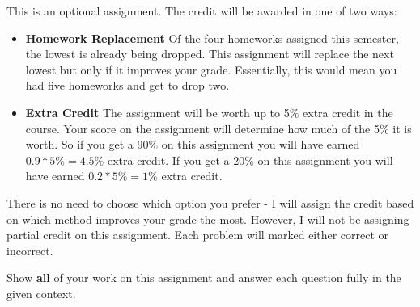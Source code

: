 \documentclass[11pt]{article}\usepackage[]{graphicx}\usepackage[]{color}
\begin{document}
\pagestyle{fancy} 

This is an optional assignment. The credit will be awarded in one of two ways:
\begin{itemize}
   \item \textbf{Homework Replacement} Of the four homeworks assigned this semester, the lowest is already being dropped. This assignment will replace the next lowest but only if it improves your grade. Essentially, this would mean you had five homeworks and get to drop two.
   \item \textbf{Extra Credit} The assignment will be worth up to 5\% extra credit in the course. Your score on the assignment will determine how much of the 5\% it is worth. So if you get a 90\% on this assignment you will have earned $0.9*5\% = 4.5\%$ extra credit. If you get a 20\% on this assignment you will have earned $0.2*5\% = 1\%$ extra credit.
\end{itemize}
There is no need to choose which option you prefer - I will assign the credit based on which method improves your grade the most. However, I will not be assigning partial credit on this assignment. Each problem will marked either correct or incorrect.

Show \textbf{all} of your work on this assignment and answer each question fully in the given context. 
\end{document}
